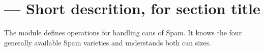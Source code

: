 



\section{ ---
         Short descrition, for section title}

%

%







The  module defines operations for handling cans of Spam.
It knows the four generally available Spam varieties and understands
both can sizes.

